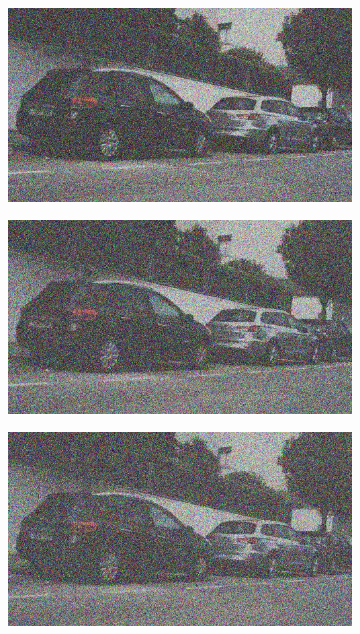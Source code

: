 \documentclass[a4paper]{ctexart}
\begin{document}
\begin{figure}[htbp]
\begin{subfigure}{0.08\textwidth}
			\label{fig：Gamma=0.3, Gauss Noise = 0.7}
		\end{subfigure}
		\begin{subfigure}{0.08\textwidth}
			\captionsetup{font=scriptsize}
			\includegraphics[width=\linewidth]{picture/Edge Detection/degrade/RGB_001 Gamma=0.3, Gauss Noise=0.8}
			\label{fig：Gamma=0.3, Gauss Noise = 0.8}
		\end{subfigure}
		\begin{subfigure}{0.08\textwidth}
			\captionsetup{font=scriptsize}
			\includegraphics[width=\linewidth]{picture/Edge Detection/degrade/RGB_001 Gamma=0.3, Gauss Noise=0.9}
			\label{fig：Gamma=0.3, Gauss Noise = 0.9}
		\end{subfigure}
		\begin{subfigure}{0.08\textwidth}
			\captionsetup{font=scriptsize}
			\includegraphics[width=\linewidth]{picture/Edge Detection/degrade/RGB_001 Gamma=0.3, Gauss Noise=1.0}

\end{subfigure}
\end{figure}
\end{document}
